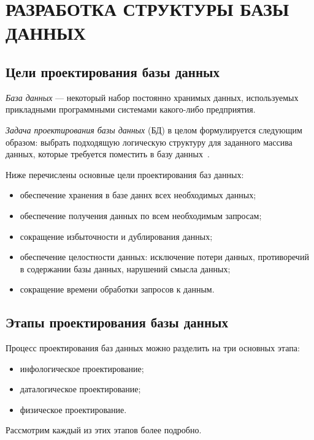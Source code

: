 \section[Разработка структуры БД]{РАЗРАБОТКА СТРУКТУРЫ БАЗЫ ДАННЫХ}
\label{sub:db_structure}

\subsection{Цели проектирования базы данных}
\label{ssub:db_structure_aims}

\textit{База данных} --- некоторый набор постоянно хранимых данных,
используемых прикладными программными системами какого-либо предприятия.

\textit{Задача проектирования базы данных} (БД) в целом формулируется
следующим образом: выбрать подходящую логическую структуру для заданного
массива данных, которые требуется поместить в базу данных~\cite{date05}.

Ниже перечислены основные цели проектирования баз данных:
\begin{itemize}
\item
  обеспечение хранения в базе даннх всех необходимых данных;
\item
  обеспечение получения данных по всем необходимым запросам;
\item
  сокращение избыточности и дублирования данных;
\item
  обеспечение целостности данных: исключение потери данных, противоречий в
  содержании базы данных, нарушений смысла данных;
\item
  сокращение времени обработки запросов к данным.
\end{itemize}

\subsection{Этапы проектирования базы данных}
\label{ssub:db_structure_stages}

Процесс проектирования баз данных можно разделить на три основных этапа:
\begin{itemize}
\item инфологическое проектирование;
\item даталогическое проектирование;
\item физическое проектирование.
\end{itemize}

Рассмотрим каждый из этих этапов более подробно.

